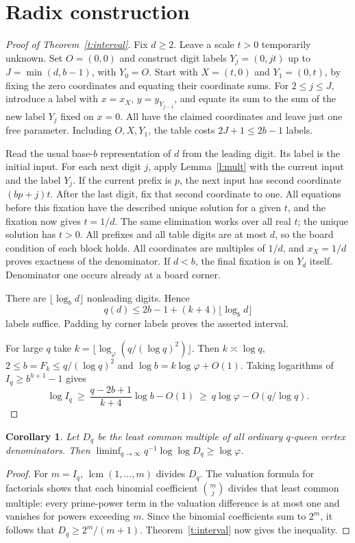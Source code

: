\documentclass[11pt]{article}
\newtheorem{corollary}[theorem]{Corollary}
\begin{document}
\section{Radix construction}
\begin{proof}[Proof of Theorem~\ref{t:interval}]
Fix $d\ge2$. Leave a scale $t>0$ temporarily unknown. Set $O=(0,0)$ and construct digit labels $Y_j=(0,jt)$ up to $J=\min(d,b-1)$, with $Y_0=O$. Start with $X=(t,0)$ and $Y_1=(0,t)$, by fixing the zero coordinates and equating their coordinate sums. For $2\le j\le J$, introduce a label with $x=x_X$, $y=y_{Y_{j-1}}$, and equate its sum to the sum of the new label $Y_j$ fixed on $x=0$. All have the claimed coordinates and leave just one free parameter. Including $O,X,Y_1$, the table costs $2J+1\le2b-1$ labels.

Read the usual base-$b$ representation of $d$ from the leading digit. Its label is the initial input. For each next digit $j$, apply Lemma~\ref{l:mult} with the current input and the label $Y_j$. If the current prefix is $p$, the next input has second coordinate $(bp+j)t$. After the last digit, fix that second coordinate to one. All equations before this fixation have the described unique solution for a given $t$, and the fixation now gives $t=1/d$. The same elimination works over all real $t$; the unique solution has $t>0$. All prefixes and all table digits are at most $d$, so the board condition of each block holds. All coordinates are multiples of $1/d$, and $x_X=1/d$ proves exactness of the denominator. If $d<b$, the final fixation is on $Y_d$ itself. Denominator one occurs already at a board corner.

There are $\lfloor\log_b d\rfloor$ nonleading digits. Hence
\[
 q(d)\le 2b-1+(k+4)\lfloor\log_b d\rfloor
\]
labels suffice. Padding by corner labels proves the asserted interval.

For large $q$ take $k=\lfloor\log_\varphi(q/(\log q)^2)\rfloor$. Then $k\asymp\log q$, $2\le b=F_k\le q/(\log q)^2$ and $\log b=k\log\varphi+O(1)$. Taking logarithms of $I_q\ge b^{h+1}-1$ gives
\[
 \log I_q\ \ge\ \frac{q-2b+1}{k+4}\log b-O(1)
 \ \ge\ q\log\varphi-O(q/\log q).
\]
\end{proof}

\begin{corollary}
Let $D_q$ be the least common multiple of all ordinary $q$-queen vertex denominators. Then $\liminf_{q\to\infty} q^{-1}\log\log D_q\ge\log\varphi$.
\end{corollary}
\begin{proof}
For $m=I_q$, $\operatorname{lcm}(1,\ldots,m)$ divides $D_q$. The valuation formula for factorials shows that each binomial coefficient $\binom{m}{j}$ divides that least common multiple: every prime-power term in the valuation difference is at most one and vanishes for powers exceeding $m$. Since the binomial coefficients sum to $2^m$, it follows that $D_q\ge2^m/(m+1)$. Theorem~\ref{t:interval} now gives the inequality.
\end{proof}
\end{document}
